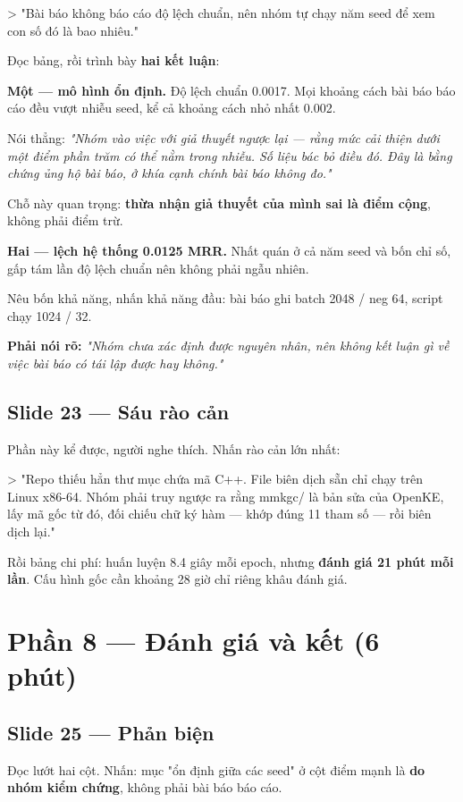 \documentclass[11pt,a4paper]{article}
\newcommand{\code}[1]{{\ttfamily\small\color{codetext}#1}}
\begin{document}
> "Bài báo không báo cáo độ lệch chuẩn, nên nhóm tự chạy năm seed để xem con số đó là bao nhiêu."

Đọc bảng, rồi trình bày \textbf{hai kết luận}:

\textbf{Một --- mô hình ổn định.} Độ lệch chuẩn 0.0017. Mọi khoảng cách bài báo báo cáo đều vượt nhiễu seed, kể cả khoảng cách nhỏ nhất 0.002.

Nói thẳng: \emph{"Nhóm vào việc với giả thuyết ngược lại --- rằng mức cải thiện dưới một điểm phần trăm có thể nằm trong nhiễu. Số liệu bác bỏ điều đó. Đây là bằng chứng ủng hộ bài báo, ở khía cạnh chính bài báo không đo."}

Chỗ này quan trọng: \textbf{thừa nhận giả thuyết của mình sai là điểm cộng}, không phải điểm trừ.

\textbf{Hai --- lệch hệ thống 0.0125 MRR.} Nhất quán ở cả năm seed và bốn chỉ số, gấp tám lần độ lệch chuẩn nên không phải ngẫu nhiên.

Nêu bốn khả năng, nhấn khả năng đầu: bài báo ghi batch 2048 / neg 64, script chạy 1024 / 32.

\textbf{Phải nói rõ:} \emph{"Nhóm chưa xác định được nguyên nhân, nên không kết luận gì về việc bài báo có tái lập được hay không."}

\subsection{Slide 23 --- Sáu rào cản}
Phần này kể được, người nghe thích. Nhấn rào cản lớn nhất:

> "Repo thiếu hẳn thư mục chứa mã C++. File biên dịch sẵn chỉ chạy trên Linux x86-64. Nhóm phải truy ngược ra rằng \code{mmkgc/} là bản sửa của OpenKE, lấy mã gốc từ đó, đối chiếu chữ ký hàm --- khớp đúng 11 tham số --- rồi biên dịch lại."

Rồi bảng chi phí: huấn luyện 8.4 giây mỗi epoch, nhưng \textbf{đánh giá 21 phút mỗi lần}. Cấu hình gốc cần khoảng 28 giờ chỉ riêng khâu đánh giá.

\section{Phần 8 --- Đánh giá và kết (6 phút)}
\subsection{Slide 25 --- Phản biện}
Đọc lướt hai cột. Nhấn: mục "ổn định giữa các seed" ở cột điểm mạnh là \textbf{do nhóm kiểm chứng}, không phải bài báo báo cáo.
\end{document}
